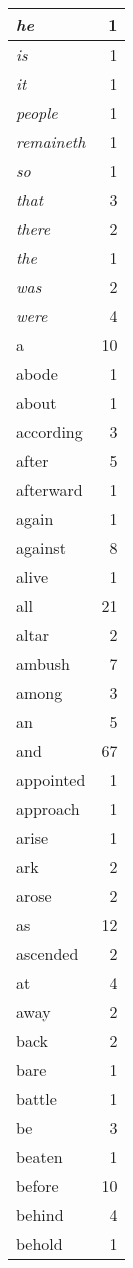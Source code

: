 \begin{center}
\begin{longtable}{l|r}
\emph{he} & 1\\ \hline 
\emph{is} & 1\\ \hline 
\emph{it} & 1\\ \hline 
\emph{people} & 1\\ \hline 
\emph{remaineth} & 1\\ \hline 
\emph{so} & 1\\ \hline 
\emph{that} & 3\\ \hline 
\emph{there} & 2\\ \hline 
\emph{the} & 1\\ \hline 
\emph{was} & 2\\ \hline 
\emph{were} & 4\\ \hline 
a & 10\\ \hline 
abode & 1\\ \hline 
about & 1\\ \hline 
according & 3\\ \hline 
after & 5\\ \hline 
afterward & 1\\ \hline 
again & 1\\ \hline 
against & 8\\ \hline 
alive & 1\\ \hline 
all & 21\\ \hline 
altar & 2\\ \hline 
ambush & 7\\ \hline 
among & 3\\ \hline 
an & 5\\ \hline 
and & 67\\ \hline 
appointed & 1\\ \hline 
approach & 1\\ \hline 
arise & 1\\ \hline 
ark & 2\\ \hline 
arose & 2\\ \hline 
as & 12\\ \hline 
ascended & 2\\ \hline 
at & 4\\ \hline 
away & 2\\ \hline 
back & 2\\ \hline 
bare & 1\\ \hline 
battle & 1\\ \hline 
be & 3\\ \hline 
beaten & 1\\ \hline 
before & 10\\ \hline 
behind & 4\\ \hline 
behold & 1\\ \hline 

\end{longtable}
\end{center}
